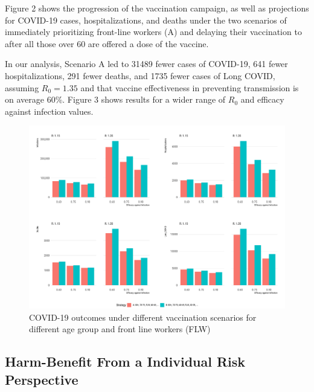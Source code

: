 \documentclass[]{interact}
\theoremstyle{plain}%
\theoremstyle{definition}
\theoremstyle{remark}
\begin{document}
Figure 2 shows the progression of the vaccination campaign, as well as
projections for COVID-19 cases, hospitalizations, and deaths under the
two scenarios of immediately prioritizing front-line workers (A) and
delaying their vaccination to after all those over 60 are offered a dose
of the vaccine.

In our analysis, Scenario A led to 31489 fewer cases of COVID-19, 641
fewer hospitalizations, 291 fewer deaths, and 1735 fewer cases of Long
COVID, assuming \(R_0=1.35\) and that vaccine effectiveness in
preventing transmission is on average 60\%. Figure 3 shows results for a
wider range of \(R_0\) and efficacy against infection values.

\begin{figure}

{\centering \includegraphics[width=1\linewidth]{../figures/fig-barplots} 

}

\caption{COVID-19 outcomes under different vaccination scenarios for different age group and front line workers (FLW)}\label{fig:fig2}
\end{figure}

\hypertarget{harm-benefit-from-a-individual-risk-perspective}{%
\subsection{Harm-Benefit From a Individual Risk
Perspective}\label{harm-benefit-from-a-individual-risk-perspective}}
\end{document}
